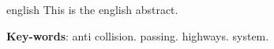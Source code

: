 \begin{resumo}[Abstract]
 \begin{otherlanguage*}{english}
   This is the english abstract.

   \vspace{\onelineskip}

   \noindent
   \textbf{Key-words}: anti collision. passing. highways. system.
 \end{otherlanguage*}
\end{resumo}
